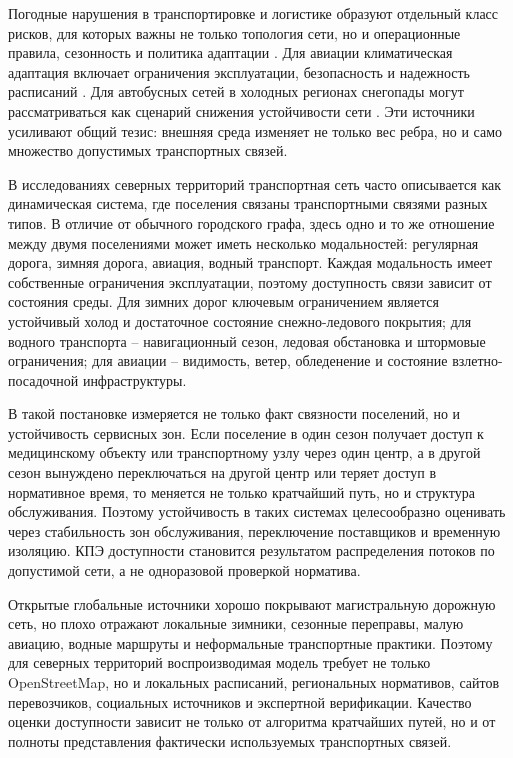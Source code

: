 Погодные нарушения в транспортировке и логистике образуют отдельный класс рисков, для которых важны не только топология сети, но и операционные правила, сезонность и политика адаптации \cite{touloumidis2025weatherDisruptions}. Для авиации климатическая адаптация включает ограничения эксплуатации, безопасность и надежность расписаний \cite{burbidge2024aviationClimate}. Для автобусных сетей в холодных регионах снегопады могут рассматриваться как сценарий снижения устойчивости сети \cite{gu2025busSnowfall}. Эти источники усиливают общий тезис: внешняя среда изменяет не только вес ребра, но и само множество допустимых транспортных связей.

В исследованиях северных территорий транспортная сеть часто описывается как динамическая система, где поселения связаны транспортными связями разных типов. В отличие от обычного городского графа, здесь одно и то же отношение между двумя поселениями может иметь несколько модальностей: регулярная дорога, зимняя дорога, авиация, водный транспорт. Каждая модальность имеет собственные ограничения эксплуатации, поэтому доступность связи зависит от состояния среды. Для зимних дорог ключевым ограничением является устойчивый холод и достаточное состояние снежно-ледового покрытия; для водного транспорта -- навигационный сезон, ледовая обстановка и штормовые ограничения; для авиации -- видимость, ветер, обледенение и состояние взлетно-посадочной инфраструктуры.

В такой постановке измеряется не только факт связности поселений, но и устойчивость сервисных зон. Если поселение в один сезон получает доступ к медицинскому объекту или транспортному узлу через один центр, а в другой сезон вынуждено переключаться на другой центр или теряет доступ в нормативное время, то меняется не только кратчайший путь, но и структура обслуживания. Поэтому устойчивость в таких системах целесообразно оценивать через стабильность зон обслуживания, переключение поставщиков и временную изоляцию. КПЭ доступности становится результатом распределения потоков по допустимой сети, а не одноразовой проверкой норматива.

Открытые глобальные источники хорошо покрывают магистральную дорожную сеть, но плохо отражают локальные зимники, сезонные переправы, малую авиацию, водные маршруты и неформальные транспортные практики. Поэтому для северных территорий воспроизводимая модель требует не только OpenStreetMap, но и локальных расписаний, региональных нормативов, сайтов перевозчиков, социальных источников и экспертной верификации. Качество оценки доступности зависит не только от алгоритма кратчайших путей, но и от полноты представления фактически используемых транспортных связей.

